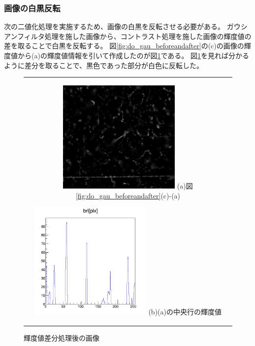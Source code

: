\documentclass[12pt,a4paper]{jarticle}
\begin{document}
\subsubsection{画像の白黒反転}
次の二値化処理を実施するため、画像の白黒を反転させる必要がある。
ガウシアンフィルタ処理を施した画像から、コントラスト処理を施した画像の輝度値の差を取ることで白黒を反転する。
図\ref{fig:do_gau_beforeandafter}の(c)の画像の輝度値から(a)の輝度値情報を引いて作成したのが図\ref{fig:do_sub}である。
図\ref{fig:do_sub}を見れば分かるように差分を取ることで、黒色であった部分が白色に反転した。
\begin{figure}[htbp]
  \centering
      \begin{tabular}{c}
        \begin{minipage}{0.5\hsize}
          \centering
            \includegraphics[clip, width=60mm]{sub.png}
            \hspace{1.6cm} (a)図\ref{fig:do_gau_beforeandafter}(c)-(a)
        \end{minipage}

        \begin{minipage}{0.5\hsize}
          \centering
            \includegraphics[clip, width=60mm]{sub_hist.png}
            \hspace{1.6cm} (b)(a)の中央行の輝度値
        \end{minipage}
    
      \end{tabular}
      \caption{輝度値差分処理後の画像\label{fig:do_sub}}
\end{figure}
\end{document}
